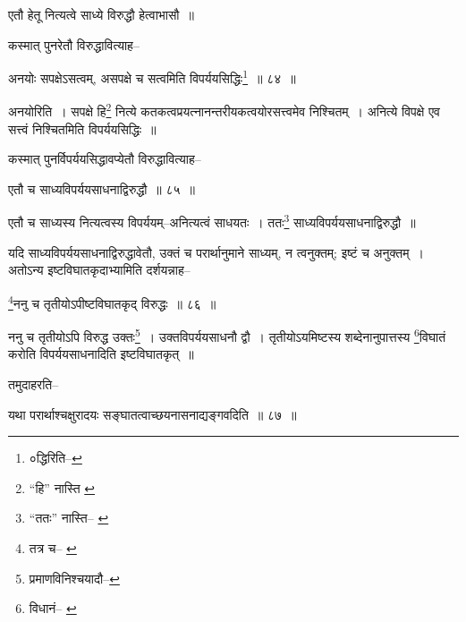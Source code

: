 \documentclass[article,12pt,a4paper]{memoir}
\begin{document}
	  \pstart एतौ हेतू नित्यत्वे साध्ये विरुद्धौ हेत्वाभासौ ॥
	\pend
       

	  \pstart कस्मात् पुनरेतौ विरुद्धावित्याह--
	\pend
       
	  \bigskip
	  \begingroup
	

	  \pstart अनयोः सपक्षेऽसत्वम्, असपक्षे च सत्वमिति विपर्ययसिद्धिः\footnote{०द्धिरिति--\cite{dp-msC}} ॥ ८४ ॥
	\pend
      
	  \endgroup
	 

	  \pstart अनयोरिति । सपक्षे हि\footnote{“हि” नास्ति \cite{dp-msA} \cite{dp-msB} \cite{dp-edP} \cite{dp-edH} \cite{dp-edE} \cite{dp-edN}} नित्ये कतकत्वप्रयत्नानन्तरीयकत्वयोरसत्त्वमेव निश्चितम् । अनित्ये विपक्षे एव सत्त्वं निश्चितमिति विपर्ययसिद्धिः ॥
	\pend
       

	  \pstart कस्मात् पुनर्विपर्ययसिद्धावप्येतौ विरुद्धावित्याह--
	\pend
       
	  \bigskip
	  \begingroup
	

	  \pstart एतौ च साध्यविपर्ययसाधनाद्विरुद्धौ ॥ ८५ ॥
	\pend
      
	  \endgroup
	 

	  \pstart एतौ च साध्यस्य नित्यत्वस्य विपर्ययम्--अनित्यत्वं साधयतः । ततः\footnote{“ततः” नास्ति--\cite{dp-msA} \cite{dp-msB} \cite{dp-edP} \cite{dp-edH} \cite{dp-edN}} साध्यविपर्ययसाधनाद्विरुद्धौ ॥
	\pend
       

	  \pstart यदि साध्यविपर्ययसाधनाद्विरुद्धावेतौ, उक्तं च परार्थानुमाने साध्यम्, न त्वनुक्तम्; इष्टं च अनुक्तम् । अतोऽन्य इष्टविघातकृदाभ्यामिति दर्शयन्नाह--
	\pend
       
	  \bigskip
	  \begingroup
	

	  \pstart \footnote{तत्र च--\cite{dp-msB} \cite{dp-edP} \cite{dp-edH}}ननु च तृतीयोऽपीष्टविघातकृद् विरुद्धः ॥ ८६ ॥
	\pend
      
	  \endgroup
	 

	  \pstart ननु च तृतीयोऽपि विरुद्ध उक्तः\footnote{प्रमाणविनिश्चयादौ--\cite{dp-msD-n}} । उक्तविपर्ययसाधनौ द्वौ । तृतीयोऽयमिष्टस्य शब्देनानुपात्तस्य \footnote{विधानं--\cite{dp-msA} \cite{dp-msB} \cite{dp-edP} \cite{dp-edH}}विघातं करोति विपर्ययसाधनादिति इष्टविघातकृत् ॥
	\pend
       

	  \pstart तमुदाहरति--
	\pend
      
	  \endgroup
	
	  \bigskip
	  \begingroup
	

	  \pstart यथा परार्थाश्चक्षुरादयः सङ्घातत्वाच्छयनासनाद्यङ्गवदिति ॥ ८७ ॥
	\pend
      
	  \endgroup
	
\end{document}
